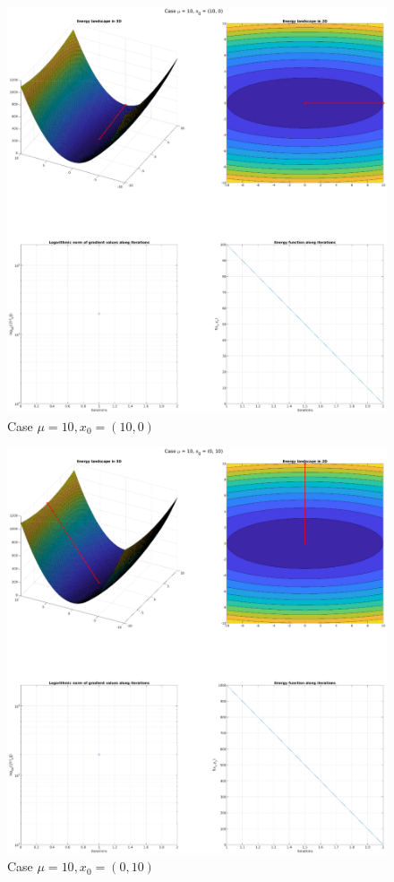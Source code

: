 \documentclass[unicode,11pt,a4paper,oneside,numbers=endperiod,openany]{scrartcl}
\begin{document}
\begin{figure}[H]
    \centering
    \caption{Case $\mu = 10, x_0 = (10, 0)$}
    \label{fig:ex3-5-mu10-x1000}
    \includegraphics[width=\textwidth, trim={5cm 3cm 5cm 1cm}, clip]{./figures/ex3-5-mu10-x1000.eps}
\end{figure}

\begin{figure}[H]
    \centering
    \caption{Case $\mu = 10, x_0 = (0, 10)$}
    \label{fig:ex3-5-mu10-x0010}
    \includegraphics[width=\textwidth, trim={5cm 3cm 5cm 1cm}, clip]{./figures/ex3-5-mu10-x0010.eps}
\end{figure}
\end{document}
